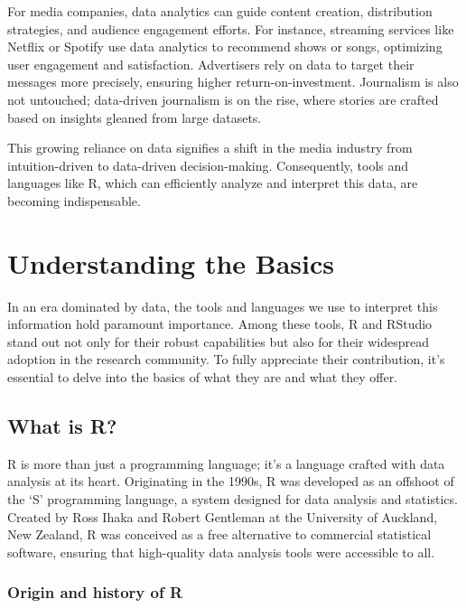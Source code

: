 \documentclass[
  b5paper]{book}
\begin{document}
For media companies, data analytics can guide content creation, distribution strategies, and audience engagement efforts. For instance, streaming services like Netflix or Spotify use data analytics to recommend shows or songs, optimizing user engagement and satisfaction. Advertisers rely on data to target their messages more precisely, ensuring higher return-on-investment. Journalism is also not untouched; data-driven journalism is on the rise, where stories are crafted based on insights gleaned from large datasets.

This growing reliance on data signifies a shift in the media industry from intuition-driven to data-driven decision-making. Consequently, tools and languages like R, which can efficiently analyze and interpret this data, are becoming indispensable.

\hypertarget{understanding-the-basics}{%
\section{Understanding the Basics}\label{understanding-the-basics}}

In an era dominated by data, the tools and languages we use to interpret this information hold paramount importance. Among these tools, R and RStudio stand out not only for their robust capabilities but also for their widespread adoption in the research community. To fully appreciate their contribution, it's essential to delve into the basics of what they are and what they offer.

\hypertarget{what-is-r}{%
\subsection*{What is R?}\label{what-is-r}}

R is more than just a programming language; it's a language crafted with data analysis at its heart. Originating in the 1990s, R was developed as an offshoot of the `S' programming language, a system designed for data analysis and statistics. Created by Ross Ihaka and Robert Gentleman at the University of Auckland, New Zealand, R was conceived as a free alternative to commercial statistical software, ensuring that high-quality data analysis tools were accessible to all.

\hypertarget{origin-and-history-of-r}{%
\subsubsection*{Origin and history of R}\label{origin-and-history-of-r}}
\end{document}
